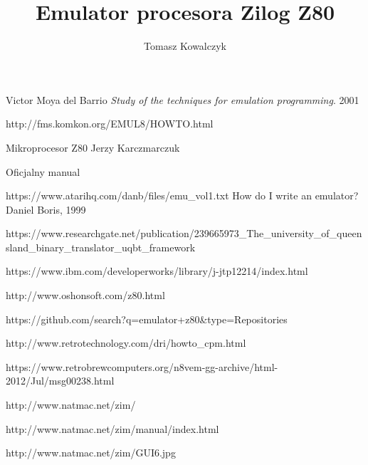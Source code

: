 \documentclass[12pt]{report}
\author{Tomasz Kowalczyk}
\title{Emulator procesora Zilog Z80}
\begin{document}
	\maketitle
	\tableofcontents
	
	
	
	
	
		
		
	
	
	
	
	
	
	
	\begin{thebibliography}{9}
		Victor Moya del Barrio
		\emph{Study of the techniques for emulation programming}.
		2001
		
		http://fms.komkon.org/EMUL8/HOWTO.html
		
		Mikroprocesor Z80 Jerzy Karczmarczuk
		
		Oficjalny manual
		
		 https://www.atarihq.com/danb/files/emu\_vol1.txt
		How do I write an emulator? Daniel Boris, 1999
		
		https://www.researchgate.net/publication/239665973\_The\_university\_of\_queensland\_binary\_translator\_uqbt\_framework
		
		https://www.ibm.com/developerworks/library/j-jtp12214/index.html
		
		http://www.oshonsoft.com/z80.html
		
		https://github.com/search?q=emulator+z80\&type=Repositories
		
		http://www.retrotechnology.com/dri/howto\_cpm.html
		
		https://www.retrobrewcomputers.org/n8vem-gg-archive/html-2012/Jul/msg00238.html

		http://www.natmac.net/zim/
		
		http://www.natmac.net/zim/manual/index.html
		
		http://www.natmac.net/zim/GUI6.jpg
		
			
	\end{thebibliography}
	
\end{document}
